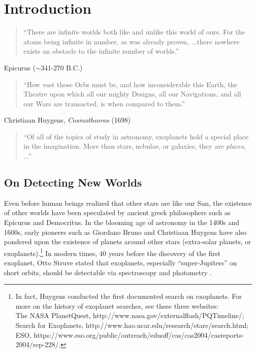\chapter{Introduction}\label{chap:introduction}

\begin{quote}
``There are infinite worlds both like and unlike this world of
ours. For the atoms being infinite in number, as was already proven,
...there nowhere exists an obstacle to the infinite number of worlds.''
\end{quote}
\hfill Epicurus ($\sim$341-270 B.C.)

\begin{quote}
``How vast those Orbs must be, and how inconsiderable this Earth, the
Theatre upon which all our mighty Designs, all our Navigations, and
all our Wars are transacted, is when compared to them.''
\end{quote}
\hfill Christiaan Huygens, {\it Cosmotheoros} (1698)

\begin{quote}
``Of all of the topics of study in astronomy, exoplanets hold a
special place in the imagination. More than stars, nebulae, or
galaxies, they are {\it places}, ...''
\end{quote}
\hfill \cite{2006PhDT.........8W}

\section{On Detecting New Worlds}

Even before human beings realized that other stars are like our Sun,
the existence of other worlds have been speculated by ancient greek
philosophers such as Epicurus and Democritus. In the blooming age of
astronomy in the 1400s and 1600s, early pioneers such as Giordano
Bruno and Christiaan Huygens have also pondered upon the existence of
planets around other stars (extra-solar planets, or
exoplanets).\footnote{In fact, Huygens conducted the first documented
search on exoplanets. For more on the history of exoplanet searches,
see these three websites:\\ The NASA PlanetQuest,
http://www.nasa.gov/externalflash/PQTimeline/; \\ Search for
Exoplanets, http://www.hao.ucar.edu/research/stare/search.html; \\
ESO,
https://www.eso.org/public/outreach/eduoff/cas/cas2004/casreports-2004/rep-228/. }
In modern times, 40 years before the discovery of the first exoplanet,
Otto Struve stated that exoplanets, especially ``super-Jupiters'' on
short orbits, should be detectable via spectroscopy and photometry
\citep{1952Obs....72..199S}.

